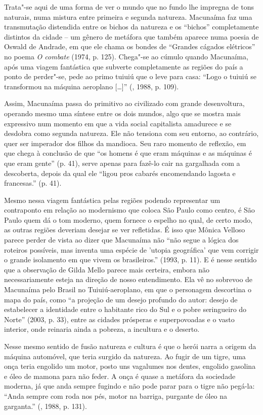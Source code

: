 Trata"-se aqui de uma forma de ver o mundo que no fundo lhe impregna de
tons naturais, numa mistura entre primeira e segunda natureza. Macunaíma
faz uma transmutação distendida entre os bichos da natureza e os
``bichos'' completamente distintos da cidade -- um gênero de metáfora
que também aparece numa poesia de Oswald de Andrade, em que ele chama os
bondes de ``Grandes cágados elétricos'' no poema \emph{O combate} (1974,
p. 125). Chega"-se ao cúmulo quando Macunaíma, após uma viagem fantástica
que subverte completamente as regiões do país a ponto de perder"-se, pede
ao primo tuiuiú que o leve para casa: ``Logo o tuiuiú se transformou na
máquina aeroplano [\ldots{}]'' (, 1988, p. 109).

Assim, Macunaíma passa do primitivo ao civilizado com grande
desenvoltura, operando mesmo uma síntese entre os dois mundos, algo que
se mostra mais expressivo num momento em que a vida social capitalista
amadurece e se desdobra como segunda natureza. Ele não tensiona com seu
entorno, ao contrário, quer ser imperador dos filhos da mandioca. Seu
raro momento de reflexão, em que chega à conclusão de que ``os homens é
que eram máquinas e as máquinas é que eram gente'' (p. 41), serve apenas
para fazê-lo cair na gargalhada com a descoberta, depois da qual ele
``ligou pros cabarés encomendando lagosta e francesas.'' (p. 41).

Mesmo nessa viagem fantástica pelas regiões podendo representar um
contraponto em relação ao modernismo que coloca São Paulo como centro, é
São Paulo quem dá o tom moderno, quem fornece o espelho no qual, de
certo modo, as outras regiões deveriam desejar se ver refletidas. É isso
que Mônica Velloso parece perder de vista ao dizer que Macunaíma não
``não segue a lógica dos roteiros possíveis, mas inventa uma espécie de
'utopia geográfica' que vem corrigir o grande isolamento em que vivem os
brasileiros.'' (1993, p. 11). E é nesse sentido que a observação de
Gilda Mello parece mais certeira, embora não necessariamente esteja na
direção de nosso entendimento. Ela vê no sobrevoo de Macunaíma pelo
Brasil no Tuiuiú-aeroplano, em que o personagem descortina o mapa do
país, como ``a projeção de um desejo profundo do autor: desejo de
estabelecer a identidade entre o habitante rico do Sul e o pobre
seringueiro do Norte'' (2003, p. 33), entre as cidades prósperas e
superpovoadas e o vasto interior, onde reinaria ainda a pobreza, a
incultura e o deserto.

Nesse mesmo sentido de fusão natureza e cultura é que o herói narra a
origem da máquina automóvel, que teria surgido da natureza. Ao fugir de
um tigre, uma onça teria engolido um motor, posto uns vagalumes nos
dentes, engolido gasolina e óleo de mamona para não feder. A onça é
quase a metáfora da sociedade moderna, já que anda sempre fugindo e não
pode parar para o tigre não pegá-la: ``Anda sempre com roda nos pés,
motor na barriga, purgante de óleo na garganta.'' (, 1988, p.
131).

